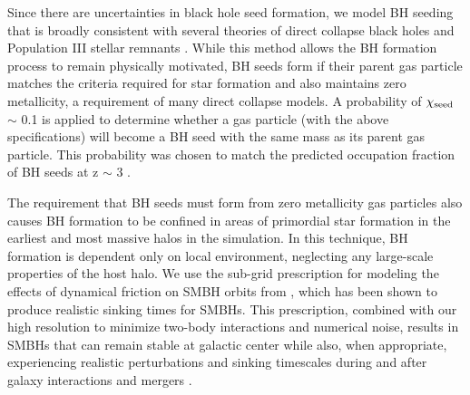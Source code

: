 \documentclass[]{emulateapj}
\begin{document}
Since there are uncertainties in black hole seed formation, we model BH seeding that is broadly consistent with several theories of direct collapse black holes \citep{Couchman1986, Abel2002, Bromm2004} and Population III stellar remnants \citep{Loeb1994, Eisenstein1995, Koushiappas2004, Begelman2006, Lodato2006}. While this method allows the BH formation process to remain physically motivated, BH seeds form if their parent gas particle matches the criteria required for star formation and also maintains zero metallicity, a requirement of many direct collapse models. A probability of $\chi_{\rm seed}$ $\sim$ 0.1 is applied to determine whether a gas particle (with the above specifications) will become a BH seed with the same mass as its parent gas particle. This probability was chosen to match the predicted occupation fraction of BH seeds at z $\sim$ 3 \citep{Volonteri2008}.

The requirement that BH seeds must form from zero metallicity gas particles also causes BH formation to be confined in areas of primordial star formation in the earliest and most massive halos in the simulation. In this technique, BH formation is dependent only on local environment, neglecting any large-scale properties of the host halo. We use the sub-grid prescription for modeling the effects of dynamical friction on SMBH orbits from \cite{Tremmel2015}, which has been shown to produce realistic sinking times for SMBHs.  This prescription, combined with our high resolution to minimize two-body interactions and numerical noise, results in SMBHs that can remain stable at galactic center while also, when appropriate, experiencing realistic perturbations and sinking timescales during and after galaxy interactions and mergers \citep{Bellovary2011}.
\end{document}

